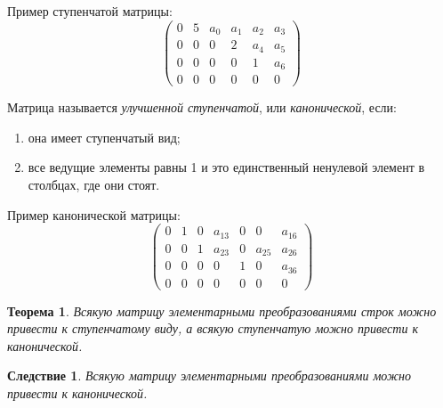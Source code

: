 \documentclass[a4paper, 12pt]{article}
\newtheorem*{que33theorem}{Теорема}
\newtheorem*{que33cons}{Следствие}
\begin{document}
Пример ступенчатой матрицы:
\[
\begin{pmatrix}
0 & 5 & a_0 & a_1 & a_2 & a_3 \\
0 & 0 &   0 &   2 & a_4 & a_5 \\
0 & 0 &   0 &   0 &   1 & a_6 \\
0 & 0 &   0 &   0 &   0 &   0
\end{pmatrix}
\]

Матрица называется \textit{улучшенной ступенчатой}, или \textit{канонической}, если:
\begin{enumerate}
\item она имеет ступенчатый вид;
\item все ведущие элементы равны 1 и это единственный ненулевой элемент в столбцах, где они стоят.
\end{enumerate}

Пример канонической матрицы:
$$
\begin{pmatrix*}
0 & 1 & 	0 & a_{13} & 0 & 0 & a_{16}\\
0 & 0 & 	1 & a_{23} & 0 & a_{25} & a_{26}\\
0 & 0 &		0 & 	 0 & 1 & 0 & a_{36}\\
0 & 0 & 	0 & 	 0 & 0 & 0 & 	  0
\end{pmatrix*}
$$

\begin{que33theorem}
Всякую матрицу элементарными преобразованиями строк можно привести к ступенчатому виду, а всякую ступенчатую можно привести к канонической. 
\end{que33theorem}

\begin{que33cons}
Всякую матрицу элементарными преобразованиями можно привести к канонической.
\end{que33cons}
\end{document}
